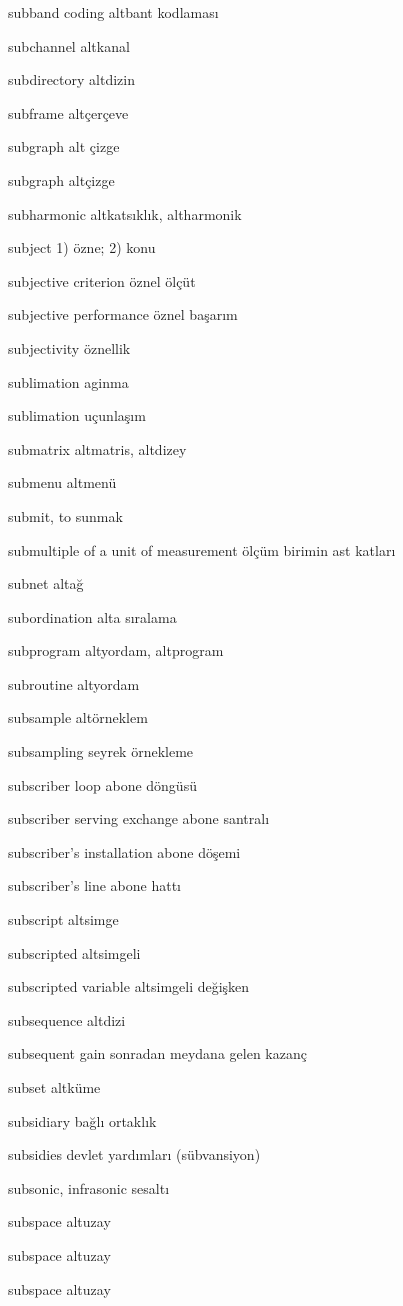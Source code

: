 \documentclass[12pt,fleqn]{article}\usepackage{../../common}
\begin{document}
subband coding altbant kodlaması

subchannel altkanal

subdirectory altdizin

subframe altçerçeve

subgraph alt çizge

subgraph altçizge

subharmonic altkatsıklık, altharmonik

subject 1) özne; 2) konu

subjective criterion öznel ölçüt

subjective performance öznel başarım

subjectivity öznellik

sublimation aginma

sublimation uçunlaşım

submatrix altmatris, altdizey

submenu altmenü

submit, to sunmak

submultiple of a unit of measurement ölçüm birimin ast katları

subnet altağ

subordination alta sıralama

subprogram altyordam, altprogram

subroutine altyordam

subsample altörneklem

subsampling seyrek örnekleme

subscriber loop abone döngüsü

subscriber serving exchange abone santralı

subscriber's installation abone döşemi

subscriber's line abone hattı

subscript altsimge

subscripted altsimgeli

subscripted variable altsimgeli değişken

subsequence altdizi

subsequent gain sonradan meydana gelen kazanç

subset altküme

subsidiary bağlı ortaklık

subsidies devlet yardımları (sübvansiyon)

subsonic, infrasonic sesaltı

subspace altuzay

subspace altuzay

subspace altuzay
\end{document}
